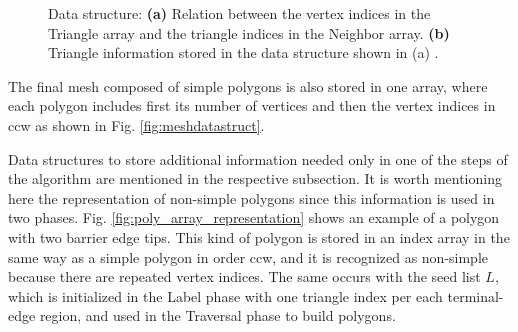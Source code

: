 \documentclass[lineno,pdflatex,sn-mathphys]{sn-jnl}%
\theoremstyle{thmstyleone}%
\theoremstyle{thmstyletwo}%
\theoremstyle{thmstylethree}%
\begin{document}
\begin{figure}
\centering     %
{}\hspace{2cm}
\caption{Data structure:  \textbf{(a)} Relation between the  vertex indices in the Triangle array and the triangle indices in the Neighbor array. \textbf{(b)} Triangle information stored  in the data structure shown in (a)
.}
\label{figs:data_and_triangle} 
\end{figure}









The final mesh composed of simple polygons is also stored in  one array, where each polygon includes first its number of vertices and then the vertex indices in ccw  as shown in Fig. \ref{fig:meshdatastruct}. 

Data structures to store additional information needed only in one of the steps of the algorithm are mentioned in the respective subsection. It is worth mentioning here the representation of non-simple polygons since this information is used in two phases. Fig. \ref{fig:poly_array_representation}  shows an example of a polygon with two barrier edge tips. This kind of polygon is stored in an index array  in the same way as a simple polygon in order ccw, and it is recognized as non-simple because there are repeated vertex indices. The same occurs with the seed list $L$, which is initialized in the Label phase with one triangle index per each terminal-edge region, and used in the Traversal phase to build polygons.  
\end{document}
